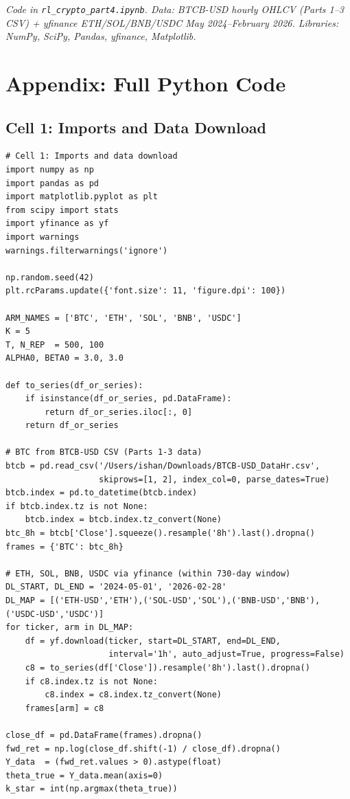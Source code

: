 \documentclass[11pt, letterpaper]{article}
\begin{document}
\vspace{6pt}
\noindent\textit{Code in \texttt{rl\_crypto\_part4.ipynb}.
Data: BTCB-USD hourly OHLCV (Parts 1--3 CSV) + yfinance ETH/SOL/BNB/USDC
May 2024--February 2026. Libraries: NumPy, SciPy, Pandas, yfinance, Matplotlib.}

\appendix
\section*{Appendix: Full Python Code}

\subsection*{Cell 1: Imports and Data Download}
\begin{lstlisting}
# Cell 1: Imports and data download
import numpy as np
import pandas as pd
import matplotlib.pyplot as plt
from scipy import stats
import yfinance as yf
import warnings
warnings.filterwarnings('ignore')

np.random.seed(42)
plt.rcParams.update({'font.size': 11, 'figure.dpi': 100})

ARM_NAMES = ['BTC', 'ETH', 'SOL', 'BNB', 'USDC']
K = 5
T, N_REP  = 500, 100
ALPHA0, BETA0 = 3.0, 3.0

def to_series(df_or_series):
    if isinstance(df_or_series, pd.DataFrame):
        return df_or_series.iloc[:, 0]
    return df_or_series

# BTC from BTCB-USD CSV (Parts 1-3 data)
btcb = pd.read_csv('/Users/ishan/Downloads/BTCB-USD_DataHr.csv',
                   skiprows=[1, 2], index_col=0, parse_dates=True)
btcb.index = pd.to_datetime(btcb.index)
if btcb.index.tz is not None:
    btcb.index = btcb.index.tz_convert(None)
btc_8h = btcb['Close'].squeeze().resample('8h').last().dropna()
frames = {'BTC': btc_8h}

# ETH, SOL, BNB, USDC via yfinance (within 730-day window)
DL_START, DL_END = '2024-05-01', '2026-02-28'
DL_MAP = [('ETH-USD','ETH'),('SOL-USD','SOL'),('BNB-USD','BNB'),('USDC-USD','USDC')]
for ticker, arm in DL_MAP:
    df = yf.download(ticker, start=DL_START, end=DL_END,
                     interval='1h', auto_adjust=True, progress=False)
    c8 = to_series(df['Close']).resample('8h').last().dropna()
    if c8.index.tz is not None:
        c8.index = c8.index.tz_convert(None)
    frames[arm] = c8

close_df = pd.DataFrame(frames).dropna()
fwd_ret = np.log(close_df.shift(-1) / close_df).dropna()
Y_data  = (fwd_ret.values > 0).astype(float)
theta_true = Y_data.mean(axis=0)
k_star = int(np.argmax(theta_true))
\end{lstlisting}
\end{document}
